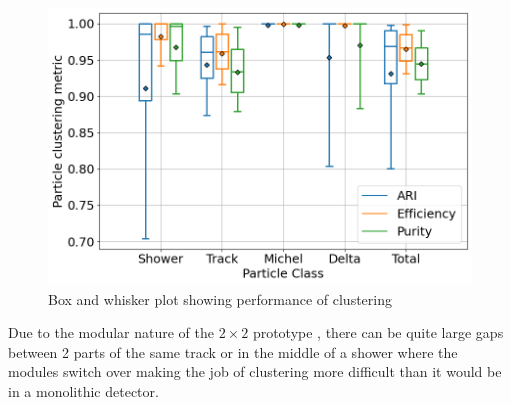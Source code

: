 \begin{figure}[H]
  \centering
  \includegraphics[width=120mm]{figures/clusteringPerformance.png}
  \caption{Box and whisker plot showing performance of clustering}
  \label{clusteringPerformance}
\end{figure}

Due to the modular nature of the $2 \times 2$ prototype , there can be quite large gaps between 2 parts of the same track or in the middle of a shower where the modules  switch over making the job of clustering more difficult than it would be in a monolithic detector.

